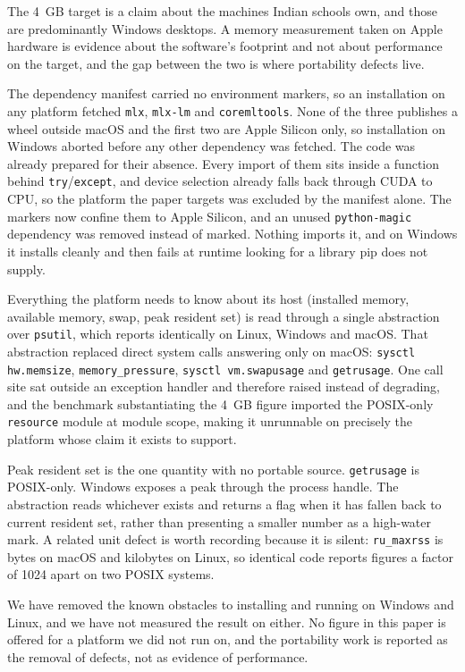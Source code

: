 The 4~GB target is a claim about the machines Indian schools own, and those are predominantly Windows desktops. A memory measurement taken on Apple hardware is evidence about the software's footprint and not about performance on the target, and the gap between the two is where portability defects live.

The dependency manifest carried no environment markers, so an installation on any platform fetched \texttt{mlx}, \texttt{mlx-lm} and \texttt{coremltools}. None of the three publishes a wheel outside macOS and the first two are Apple Silicon only, so installation on Windows aborted before any other dependency was fetched. The code was already prepared for their absence. Every import of them sits inside a function behind \texttt{try}/\texttt{except}, and device selection already falls back through CUDA to CPU, so the platform the paper targets was excluded by the manifest alone. The markers now confine them to Apple Silicon, and an unused \texttt{python-magic} dependency was removed instead of marked. Nothing imports it, and on Windows it installs cleanly and then fails at runtime looking for a library pip does not supply.

Everything the platform needs to know about its host (installed memory, available memory, swap, peak resident set) is read through a single abstraction over \texttt{psutil}, which reports identically on Linux, Windows and macOS. That abstraction replaced direct system calls answering only on macOS: \texttt{sysctl hw.memsize}, \texttt{memory\_pressure}, \texttt{sysctl vm.swapusage} and \texttt{getrusage}. One call site sat outside an exception handler and therefore raised instead of degrading, and the benchmark substantiating the 4~GB figure imported the POSIX-only \texttt{resource} module at module scope, making it unrunnable on precisely the platform whose claim it exists to support.

Peak resident set is the one quantity with no portable source. \texttt{getrusage} is POSIX-only. Windows exposes a peak through the process handle. The abstraction reads whichever exists and returns a flag when it has fallen back to current resident set, rather than presenting a smaller number as a high-water mark. A related unit defect is worth recording because it is silent: \texttt{ru\_maxrss} is bytes on macOS and kilobytes on Linux, so identical code reports figures a factor of 1024 apart on two POSIX systems.

We have removed the known obstacles to installing and running on Windows and Linux, and we have not measured the result on either. No figure in this paper is offered for a platform we did not run on, and the portability work is reported as the removal of defects, not as evidence of performance.


